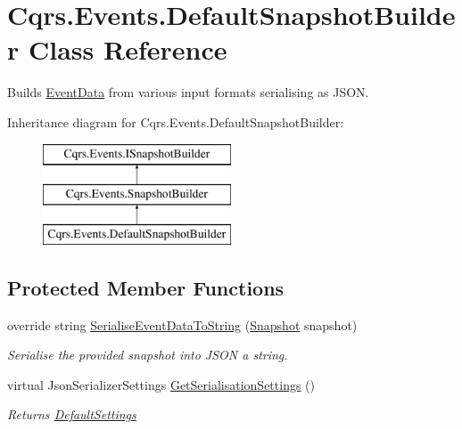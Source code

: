 \hypertarget{classCqrs_1_1Events_1_1DefaultSnapshotBuilder}{}\section{Cqrs.\+Events.\+Default\+Snapshot\+Builder Class Reference}
\label{classCqrs_1_1Events_1_1DefaultSnapshotBuilder}


Builds \hyperlink{classCqrs_1_1Events_1_1EventData}{Event\+Data} from various input formats serialising as J\+S\+ON.  


Inheritance diagram for Cqrs.\+Events.\+Default\+Snapshot\+Builder\+:\begin{figure}[H]
\begin{center}
\leavevmode
\includegraphics[height=3.000000cm]{classCqrs_1_1Events_1_1DefaultSnapshotBuilder}
\end{center}
\end{figure}
\subsection*{Protected Member Functions}
\begin{DoxyCompactItemize}
\item 
override string \hyperlink{classCqrs_1_1Events_1_1DefaultSnapshotBuilder_aa7a6bf5a1ba1ed176ecf12170645033e_aa7a6bf5a1ba1ed176ecf12170645033e}{Serialise\+Event\+Data\+To\+String} (\hyperlink{classCqrs_1_1Snapshots_1_1Snapshot}{Snapshot} snapshot)
\begin{DoxyCompactList}\small\item\em Serialise the provided {\itshape snapshot}  into J\+S\+ON a string. \end{DoxyCompactList}\item 
virtual Json\+Serializer\+Settings \hyperlink{classCqrs_1_1Events_1_1DefaultSnapshotBuilder_a16686da04ea2766679fd9b04c0fa5fd2_a16686da04ea2766679fd9b04c0fa5fd2}{Get\+Serialisation\+Settings} ()
\begin{DoxyCompactList}\small\item\em Returns \hyperlink{classCqrs_1_1Events_1_1DefaultSnapshotBuilder_ab65162b37e4fff19014e145cf163f6ae_ab65162b37e4fff19014e145cf163f6ae}{Default\+Settings} \end{DoxyCompactList}\end{DoxyCompactItemize}
